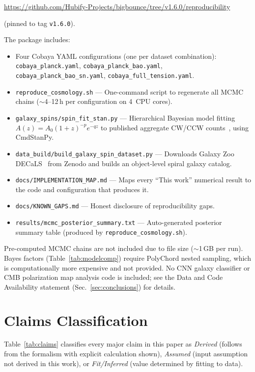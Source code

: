 \documentclass[aps,prd,twocolumn,superscriptaddress,showpacs,preprintnumbers,nofootinbib,longbibliography,floatfix]{revtex4-2}
\begin{document}
\begin{center}
\url{https://github.com/Hubify-Projects/bigbounce/tree/v1.6.0/reproducibility}
\end{center}
\noindent (pinned to tag \texttt{v1.6.0}).

\noindent The package includes:
\begin{itemize}[leftmargin=*]
\item Four Cobaya YAML configurations (one per dataset combination): \texttt{cobaya\_planck.yaml}, \texttt{cobaya\_planck\_bao.yaml}, \texttt{cobaya\_planck\_bao\_sn.yaml}, \texttt{cobaya\_full\_tension.yaml}.
\item \texttt{reproduce\_cosmology.sh} --- One-command script to regenerate all MCMC chains ($\sim$4--12\,h per configuration on 4~CPU cores).
\item \texttt{galaxy\_spins/spin\_fit\_stan.py} --- Hierarchical Bayesian model fitting $A(z) = A_0(1+z)^{-p}e^{-qz}$ to published aggregate CW/CCW counts~\cite{Shamir2024}, using CmdStanPy.
\item \texttt{data\_build/build\_galaxy\_spin\_dataset.py} --- Downloads Galaxy Zoo DECaLS~\cite{Walmsley2022} from Zenodo and builds an object-level spiral galaxy catalog.
\item \texttt{docs/IMPLEMENTATION\_MAP.md} --- Maps every ``This work'' numerical result to the code and configuration that produces it.
\item \texttt{docs/KNOWN\_GAPS.md} --- Honest disclosure of reproducibility gaps.
\item \texttt{results/mcmc\_posterior\_summary.txt} --- Auto-generated posterior summary table (produced by \texttt{reproduce\_cosmology.sh}).
\end{itemize}

\noindent Pre-computed MCMC chains are not included due to file size ($\sim$1\,GB per run). Bayes factors (Table~\ref{tab:modelcomp}) require PolyChord nested sampling, which is computationally more expensive and not provided. No CNN galaxy classifier or CMB polarization map analysis code is included; see the Data and Code Availability statement (Sec.~\ref{sec:conclusions}) for details.


\section{Claims Classification}\label{app:claims}

Table~\ref{tab:claims} classifies every major claim in this paper as \textit{Derived} (follows from the formalism with explicit calculation shown), \textit{Assumed} (input assumption not derived in this work), or \textit{Fit/Inferred} (value determined by fitting to data).
\end{document}
